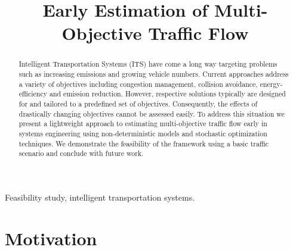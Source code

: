 \documentclass[conference]{../cls/IEEEtran}
\begin{document}
\title{Early Estimation of Multi-Objective Traffic Flow}

\author{
	\and
}

\maketitle

\begin{abstract}
Intelligent Transportation Systems (ITS) have come a long way targeting
problems such as increasing emissions and growing vehicle numbers. Current
approaches address a variety of objectives including congestion management,
collision avoidance, energy-efficiency and emission reduction. However,
respective solutions typically are designed for and tailored to a predefined set
of objectives. Consequently, the effects of drastically changing objectives
cannot be assessed easily. To address this situation we present a lightweight
approach to estimating multi-objective traffic flow early in systems engineering
using non-deterministic models and stochastic optimization techniques. We
demonstrate the feasibility of the framework using a basic traffic scenario and
conclude with future work.
\end{abstract}

\begin{IEEEkeywords}
Feasibility study, intelligent transportation systems.
\end{IEEEkeywords}

\section{Motivation}
\label{sec:motivation}
\end{document}
